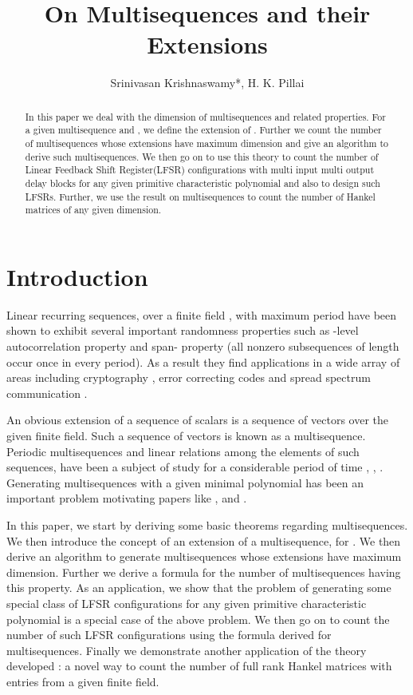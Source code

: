 \documentclass[letterpaper, 12 pt]{article}  \usepackage{amssymb}
\title{
On Multisequences and their Extensions  
}
\author{Srinivasan Krishnaswamy*, H. K. Pillai}
\begin{document}
\maketitle

\begin{abstract}
In this paper we deal with the dimension of multisequences and related
properties. For a given multisequence  and , we define
the extension of . Further we count the number of multisequences 
whose extensions have maximum dimension and give an algorithm to derive
such multisequences. We then go on to use this theory to count the number of
Linear Feedback Shift Register(LFSR) configurations with multi input multi
output delay blocks for any given primitive characteristic polynomial and
also to design such LFSRs. Further, we use the result on multisequences to count the number of Hankel matrices of
any given dimension. 
\end{abstract}

\section{Introduction}
Linear recurring sequences, over a finite field , with maximum period have been shown to 
exhibit several important randomness properties such as -level
autocorrelation property and span- property (all nonzero subsequences of
length  occur once in every period)\cite{Golomb}. As a result they  
find applications in a wide array of areas including  cryptography 
\cite{Schneier}, error correcting
codes  \cite{peterson} and spread spectrum communication \cite{pickholtz}. 

An obvious extension of a sequence of scalars is a sequence of vectors over the
given finite field. Such a sequence of vectors is known as a multisequence.
Periodic multisequences and linear relations among the elements of such
sequences,  have been a subject of study for a considerable period of time
\cite{Daykin}, \cite{Mullen}, \cite{Yucas}. Generating multisequences with a
given minimal polynomial has been an important problem motivating papers like
\cite{Ecuyer}, \cite{Neider1} and \cite{Neider2}.  

In this paper, we start by deriving some basic theorems regarding
multisequences. We then introduce the concept of an extension of a
multisequence, for . We then derive an
algorithm to generate multisequences whose extensions have maximum dimension. Further
we derive a formula for the number of multisequences having this property.
As an application, we show that the problem of generating some special class of LFSR configurations for any given primitive characteristic polynomial is a special case of the above problem. We then go on to count the number of such LFSR configurations using the
formula derived for multisequences. Finally we demonstrate another application of the theory developed : a novel way to count the number of full rank Hankel matrices with entries from a given finite field. 
\end{document}
